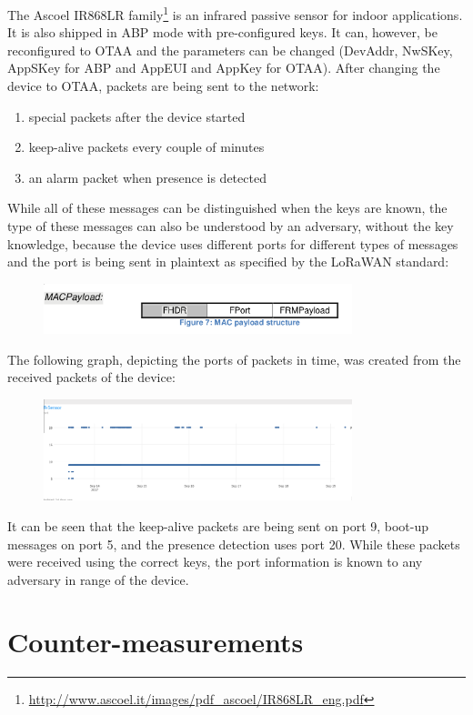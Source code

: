 {The Ascoel IR868LR family\footnote{\url{http://www.ascoel.it/images/pdf_ascoel/IR868LR_eng.pdf}} is
an infrared passive sensor for indoor applications. It is also shipped
in ABP mode with pre-configured keys. It can, however, be reconfigured
to OTAA and the parameters can be changed (DevAddr, NwSKey, AppSKey for
ABP and AppEUI and AppKey for OTAA). After changing the device to OTAA,
packets are being sent to the network:}
\begin{enumerate}
\tightlist
\item
  {special packets after the device started}
\item
  {keep-alive packets every couple of minutes}
\item
  {an alarm packet when presence is detected}
\end{enumerate}
{While all of these messages can be distinguished when the keys are
known, the type of these messages can also be understood by an
adversary, without the key knowledge, because the device uses different
ports for different types of messages and the port is being sent in
plaintext as specified by the LoRaWAN standard:}
\begin{figure}[h!]
{\includegraphics[width=0.8\textwidth]{images/image13.png}}
\end{figure}
{The following graph, depicting the ports of packets in time, was
created from the received packets of the device:}
\begin{figure}[h!]
{\includegraphics[width=0.8\textwidth]{images/image3.png}}
\end{figure}

{It can be seen that the keep-alive packets are being sent on port 9,
boot-up messages on port 5, and the presence detection uses port 20.
While these packets were received using the correct keys, the port
information is known to any adversary in range of the device.}

\section{\texorpdfstring{{Counter-measurements}}{Counter measurements}}\label{h.5p1f7221qm42}

